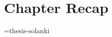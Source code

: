 \documentclass[thesis-solanki.tex]{subfiles}
\begin{document}

\clearpage
\section{Chapter Recap}

\if\jobname={thesis-solanki}\else
\begin{scope}
  \nolinenumbers
  \enotesize
  \par
  \begin{singlespace}
  \setlength{\parskip}{12pt plus 2pt minus 1pt}
  \theendnotes
  \par
  \end{singlespace}
\end{scope}
\fi
\end{document}
